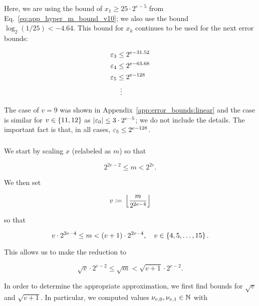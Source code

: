 \begin{itemize}
\noindent
Here, we are using the bound of $x_{1}\ge25\cdot2^{e-5}$
from Eq.~\eqref{eq:app_hyper_m_bound_v10};
we also use the bound $\log_{2}(1/25) < -4.64$.
This bound for $x_{k}$ continues to be used for the next error bounds:

\begin{align}
    \varepsilon_{3} &\le 2^{e-31.52} \nonumber\\
    \varepsilon_{4} &\le 2^{e-63.68} \nonumber\\
    \varepsilon_{5} &\le 2^{e-128} \nonumber\\
        &\ \vdots
\end{align}

The case of $v = 9$ was shown in Appendix~\ref{app:error_bounds:linear}
and the case is similar for $v\in\left\{ 11,12 \right\}$
as $\left| \varepsilon_{0} \right| \le 3\cdot2^{e-5}$;
we do not include the details.
The important fact is that, in all cases, $\varepsilon_{5}\le 2^{e-128}$.
\end{itemize}


\subsubsection{\LookupFour{}}
\label{app:error_bounds:lookup4}

We start by scaling $x$ (relabeled as $m$) so that

\begin{equation}
    2^{2e-2} \le m < 2^{2e}.
\end{equation}

\noindent
We then set

\begin{equation}
    v \coloneqq{} \left\lfloor \frac{m}{2^{2e-4}} \right\rfloor
\end{equation}

\noindent
so that

\begin{equation}
    v\cdot2^{2e-4} \le m < \left( v+1 \right)\cdot2^{2e-4},
    \quad v\in\left\{ 4, 5, \dots, 15 \right\}.
\end{equation}

\noindent
This allows us to make the reduction to

\begin{equation}
    \sqrt{v}\cdot2^{e-2} \le \sqrt{m} < \sqrt{v+1}\cdot2^{e-2}.
    \label{eq:app_lookup4_m_bound}
\end{equation}

In order to determine the appropriate approximation,
we first find bounds for $\sqrt{v}$ and $\sqrt{v+1}$.
In particular, we computed values $\nu_{v,0}, \nu_{v,1}\in\mathbb{N}$ with

